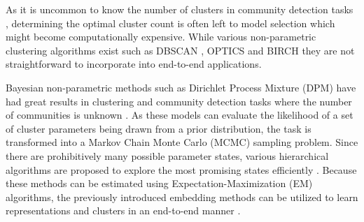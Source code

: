 As it is uncommon to know the number of clusters in community detection tasks \cite{fortunatoCommunityDetectionGraphs2010}, determining the optimal cluster count is often left to model selection which might become computationally expensive.
While various non-parametric clustering algorithms exist such as DBSCAN \cite{esterDensitybasedAlgorithmDiscovering1996}, OPTICS \cite{ankerstOPTICSOrderingPoints1999} and BIRCH \cite{zhangBIRCHEfficientData1996} they are not straightforward to incorporate into end-to-end applications.

Bayesian non-parametric methods such as Dirichlet Process Mixture (DPM) have had great results in clustering and community detection tasks where the number of communities is unknown \cite{zhuCombiningRandomWalks2016, zhuBayesianComplexNetwork2019, tonellatoBayesianNonparametricClustering2020}. 
As these models can evaluate the likelihood of a set of cluster parameters being drawn from a prior distribution, the task is transformed into a Markov Chain Monte Carlo (MCMC) sampling problem. Since there are prohibitively many possible parameter states, various hierarchical algorithms are proposed to explore the most promising states efficiently \cite{tehHierarchicalDirichletProcesses2006, changParallelSamplingDP2013a}.
Because these methods can be estimated using Expectation-Maximization (EM) algorithms, the previously introduced embedding methods can be utilized to learn representations and clusters in an end-to-end manner \cite{cavallariLearningCommunityEmbedding2017, ronenDeepDPMDeepClustering2022}.
